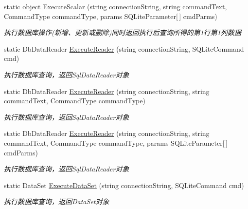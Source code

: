 \begin{DoxyCompactItemize}
static object \hyperlink{class_x_c_l_net_tools_1_1_data_base_1_1_s_q_lite_1_1_s_q_lite_helper_ac62255ae8784135b3280db03b6254669}{Execute\+Scalar} (string connection\+String, string command\+Text, Command\+Type command\+Type, params S\+Q\+Lite\+Parameter\mbox{[}$\,$\mbox{]} cmd\+Parms)
\begin{DoxyCompactList}\small\item\em 执行数据库操作(新增、更新或删除)同时返回执行后查询所得的第1行第1列数据 \end{DoxyCompactList}\item 
static Db\+Data\+Reader \hyperlink{class_x_c_l_net_tools_1_1_data_base_1_1_s_q_lite_1_1_s_q_lite_helper_a737c4bac358afea529c32ad69697b0d0}{Execute\+Reader} (string connection\+String, S\+Q\+Lite\+Command cmd)
\begin{DoxyCompactList}\small\item\em 执行数据库查询，返回\+Sql\+Data\+Reader对象 \end{DoxyCompactList}\item 
static Db\+Data\+Reader \hyperlink{class_x_c_l_net_tools_1_1_data_base_1_1_s_q_lite_1_1_s_q_lite_helper_acf0efc58fc87c16e945c497c256ef237}{Execute\+Reader} (string connection\+String, string command\+Text, Command\+Type command\+Type)
\begin{DoxyCompactList}\small\item\em 执行数据库查询，返回\+Sql\+Data\+Reader对象 \end{DoxyCompactList}\item 
static Db\+Data\+Reader \hyperlink{class_x_c_l_net_tools_1_1_data_base_1_1_s_q_lite_1_1_s_q_lite_helper_addf7b420cffcec8709d9dde39268f743}{Execute\+Reader} (string connection\+String, string command\+Text, Command\+Type command\+Type, params S\+Q\+Lite\+Parameter\mbox{[}$\,$\mbox{]} cmd\+Parms)
\begin{DoxyCompactList}\small\item\em 执行数据库查询，返回\+Sql\+Data\+Reader对象 \end{DoxyCompactList}\item 
static Data\+Set \hyperlink{class_x_c_l_net_tools_1_1_data_base_1_1_s_q_lite_1_1_s_q_lite_helper_a41a75d29bd830b9d4b6a3ff672a02f62}{Execute\+Data\+Set} (string connection\+String, S\+Q\+Lite\+Command cmd)
\begin{DoxyCompactList}\small\item\em 执行数据库查询，返回\+Data\+Set对象 \end{DoxyCompactList}\item 

\end{DoxyCompactItemize}
